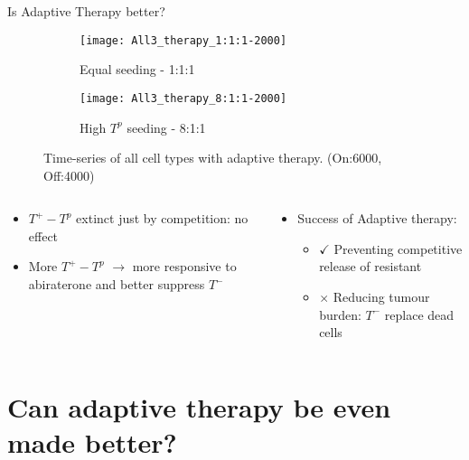 \begin{frame}{Is Adaptive Therapy better?}
  \begin{figure}[h]
    \begin{adjustwidth}{-5cm}{-5cm}
      \centering
      \begin{subfigure}[b]{0.53\textwidth}
        \centering
        \texttt{[image: All3\_therapy\_1:1:1-2000]}
        \caption{Equal seeding - 1:1:1}
      \end{subfigure}
      \begin{subfigure}[b]{0.53\textwidth}
        \centering
        \texttt{[image: All3\_therapy\_8:1:1-2000]}
        \caption{High $T^p$ seeding - 8:1:1}
      \end{subfigure}
    \end{adjustwidth}
    \caption{Time-series of all cell types with adaptive therapy. (On:6000, Off:4000)}
  \end{figure}
  \begin{columns}
    \begin{column}{0.5\textwidth}
      \begin{itemize}
        \item<1-> $T^+ - T^p$ extinct just by competition: no effect
        \item<2-> More $T^+ - T^p$ $\rightarrow$ more responsive to abiraterone and better suppress $T^-$
      \end{itemize}
    \end{column}
    \begin{column}{0.5\textwidth}
      \begin{itemize}
        \item<3-> Success of Adaptive therapy:
        \begin{itemize}
          \item<4-> $\checkmark$ Preventing competitive release of resistant
          \item<5-> $\times$ Reducing tumour burden: $T^-$ replace dead cells
        \end{itemize}
      \end{itemize}
    \end{column}
  \end{columns}
\end{frame}

\section{Can adaptive therapy be even made better?}


